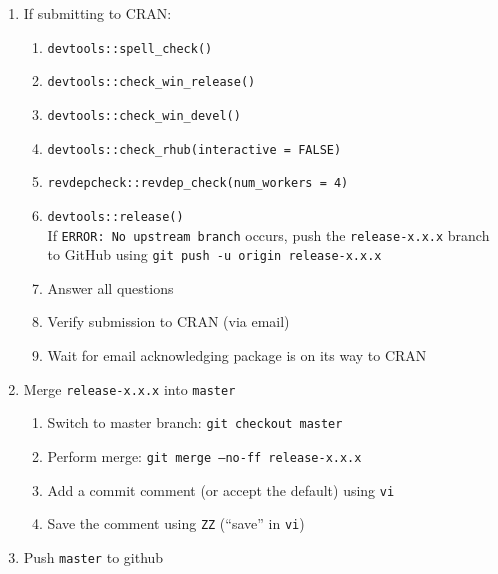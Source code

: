 \documentclass{article}
\begin{document}
\begin{enumerate}

  \item If submitting to CRAN:
  
	\begin{enumerate}
	  
	  \item \verb+devtools::spell_check()+

	  \item \verb+devtools::check_win_release()+
	  
	  \item \verb+devtools::check_win_devel()+

	  \item \verb+devtools::check_rhub(interactive = FALSE)+

	  \item \verb+revdepcheck::revdep_check(num_workers = 4)+

	  \item \verb+devtools::release()+ \\
            If \texttt{ERROR: No upstream branch} occurs, 
            push the \texttt{release-x.x.x} branch to GitHub using
            \texttt{git push -u origin release-x.x.x}
        
      \item Answer all questions
      
      \item Verify submission to CRAN (via email)
	  
	  \item Wait for email acknowledging package is on its way to CRAN
            
	\end{enumerate}
  \item Merge \texttt{release-x.x.x} into \texttt{master}
  \begin{enumerate}

    \item Switch to master branch: \texttt{git checkout master} 

    \item Perform merge: \texttt{git merge --no-ff release-x.x.x}
	
	\item Add a commit comment (or accept the default) using \texttt{vi} 
	
	\item Save the comment using \texttt{ZZ} (``save'' in \texttt{vi})
	
  \end{enumerate}
  \item Push \texttt{master} to github
  

\end{enumerate}
\end{document}
